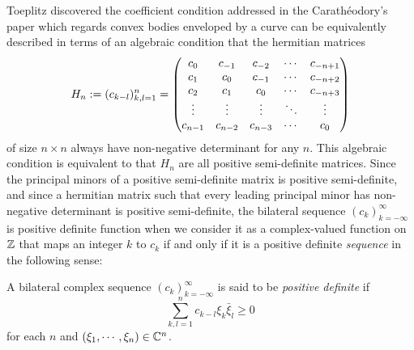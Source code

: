 \documentclass[a4paper]{article}
\begin{document}
Toeplitz discovered the coefficient condition addressed in the Carath\'eodory's paper which regards convex bodies enveloped by a curve can be equivalently described in terms of an algebraic condition that the hermitian matrices
\[H_n:=(c_{k-l})_{k,l=1}^n=\begin{pmatrix}c_0&c_{-1}&c_{-2}&\cdots&c_{-n+1}\\c_1&c_0&c_{-1}&\cdots&c_{-n+2}\\c_2&c_1&c_0&\cdots&c_{-n+3}\\\vdots&\vdots&\vdots&\ddots&\vdots\\c_{n-1}&c_{n-2}&c_{n-3}&\cdots&c_0\end{pmatrix}\]
of size $n\times n$ always have non-negative determinant for any $n$.
This algebraic condition is equivalent to that $H_n$ are all positive semi-definite matrices.
Since the principal minors of a positive semi-definite matrix is positive semi-definite, and since a hermitian matrix such that every leading principal minor has non-negative determinant is positive semi-definite, the bilateral sequence $(c_k)_{k=-\infty}^\infty$ is positive definite function when we consider it as a complex-valued function on $\mathbb{Z}$ that maps an integer $k$ to $c_k$ if and only if it is a positive definite \emph{sequence} in the following sense:

\begin{defn}
A bilateral complex sequence $(c_k)_{k=-\infty}^\infty$ is said to be \emph{positive definite} if
\[\sum_{k,l=1}^nc_{k-l}\xi_k\bar\xi_l\ge0\]
for each $n$ and $(\xi_1,\cdots,\xi_n)\in\mathbb{C}^n$.
\end{defn}
\end{document}
